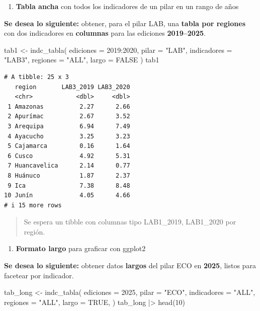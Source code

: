 \documentclass[
  11pt,
  letterpaper,
  DIV=11,
  numbers=noendperiod]{scrartcl}
\newenvironment{Shaded}{\begin{snugshade}}{\end{snugshade}}
\newcommand{\AttributeTok}[1]{\textcolor[rgb]{0.40,0.45,0.13}{#1}}
\newcommand{\ConstantTok}[1]{\textcolor[rgb]{0.56,0.35,0.01}{#1}}
\newcommand{\DecValTok}[1]{\textcolor[rgb]{0.68,0.00,0.00}{#1}}
\newcommand{\FunctionTok}[1]{\textcolor[rgb]{0.28,0.35,0.67}{#1}}
\newcommand{\NormalTok}[1]{\textcolor[rgb]{0.00,0.23,0.31}{#1}}
\newcommand{\OtherTok}[1]{\textcolor[rgb]{0.00,0.23,0.31}{#1}}
\newcommand{\SpecialCharTok}[1]{\textcolor[rgb]{0.37,0.37,0.37}{#1}}
\newcommand{\StringTok}[1]{\textcolor[rgb]{0.13,0.47,0.30}{#1}}
\providecommand{\tightlist}{%
  \setlength{\itemsep}{0pt}\setlength{\parskip}{0pt}}\usepackage{longtable,booktabs,array}
\begin{document}
\begin{enumerate}
\def\labelenumi{\arabic{enumi}.}
\tightlist
\item
  \textbf{Tabla ancha} con todos los indicadores de un pilar en un rango
  de años
\end{enumerate}

\textbf{Se desea lo siguiente:} obtener, para el pilar LAB, una
\textbf{tabla por regiones} con dos indicadores en \textbf{columnas}
para las ediciones \textbf{2019--2025}.

\begin{Shaded}
\begin{Highlighting}[]
\NormalTok{tab1 }\OtherTok{\textless{}{-}} \FunctionTok{indc\_tabla}\NormalTok{(}
  \AttributeTok{ediciones    =} \DecValTok{2019}\SpecialCharTok{:}\DecValTok{2020}\NormalTok{,}
  \AttributeTok{pilar        =} \StringTok{"LAB"}\NormalTok{,}
  \AttributeTok{indicadores  =} \StringTok{"LAB3"}\NormalTok{,}
  \AttributeTok{regiones     =} \StringTok{"ALL"}\NormalTok{, }
  \AttributeTok{largo        =} \ConstantTok{FALSE}
\NormalTok{)}
\NormalTok{tab1}
\end{Highlighting}
\end{Shaded}

\begin{verbatim}
# A tibble: 25 x 3
   region       LAB3_2019 LAB3_2020
   <chr>            <dbl>     <dbl>
 1 Amazonas          2.27      2.66
 2 Apurímac          2.67      3.52
 3 Arequipa          6.94      7.49
 4 Ayacucho          3.25      3.23
 5 Cajamarca         0.16      1.64
 6 Cusco             4.92      5.31
 7 Huancavelica      2.14      0.77
 8 Huánuco           1.87      2.37
 9 Ica               7.38      8.48
10 Junín             4.05      4.66
# i 15 more rows
\end{verbatim}

\begin{quote}
Se espera un tibble con columnas tipo LAB1\_2019, LAB1\_2020 por región.
\end{quote}

\begin{enumerate}
\def\labelenumi{\arabic{enumi}.}
\setcounter{enumi}{1}
\tightlist
\item
  \textbf{Formato largo} para graficar con ggplot2
\end{enumerate}

\textbf{Se desea lo siguiente:} obtener datos \textbf{largos} del pilar
ECO en \textbf{2025}, listos para facetear por indicador.

\begin{Shaded}
\begin{Highlighting}[]
\NormalTok{tab\_long }\OtherTok{\textless{}{-}} \FunctionTok{indc\_tabla}\NormalTok{(}
  \AttributeTok{ediciones    =} \DecValTok{2025}\NormalTok{,}
  \AttributeTok{pilar        =} \StringTok{"ECO"}\NormalTok{,}
  \AttributeTok{indicadores  =} \StringTok{"ALL"}\NormalTok{,}
  \AttributeTok{regiones     =} \StringTok{"ALL"}\NormalTok{,}
  \AttributeTok{largo        =} \ConstantTok{TRUE}\NormalTok{,}
\NormalTok{)}
\NormalTok{tab\_long }\SpecialCharTok{|\textgreater{}} 
  \FunctionTok{head}\NormalTok{(}\DecValTok{10}\NormalTok{)}
\end{Highlighting}
\end{Shaded}
\end{document}
